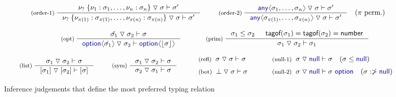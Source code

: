 \documentclass[10pt,preprint,blind,clearpagebib]{sigplanconf}
\newcommand{\langl}{\begin{picture}(4.5,7)
\put(1.1,2.5){\rotatebox{60}{\line(1,0){5.5}}}
\put(1.1,2.5){\rotatebox{300}{\line(1,0){5.5}}}
\end{picture}}
\newcommand{\rangl}{\begin{picture}(4.5,7)
\put(.9,2.5){\rotatebox{120}{\line(1,0){5.5}}}
\put(.9,2.5){\rotatebox{240}{\line(1,0){5.5}}}
\end{picture}}
\newcommand{\kvd}[1]{\textnormal{\textcolor{kvdclr}{\sffamily #1}}}
\newcommand{\ident}[1]{\textnormal{\sffamily #1}}
\newcommand{\tsep}[0]{\; \triangledown \;}
\newcommand{\dropopt}[1]{\lfloor#1\rfloor}
\newcommand{\tytagof}{\ident{tagof}}
\begin{document}
\begin{figure}[t]
\begin{equation*}
\inference[(order-1)\;]
  { \nu_? \; \{ \nu_1 : \sigma_1, \ldots, \nu_n : \sigma_n \} \tsep \sigma \vdash \sigma' }
  { \nu_? \; \{ \nu_{\pi(1)} : \sigma_{\pi(1)}, \ldots, \nu_{\pi(n)} : \sigma_{\pi(n)} \} \tsep \sigma \vdash \sigma' }
\quad
\inference[(order-2)\;]
  { \kvd{any}\langl\sigma_1, \ldots, \sigma_n\rangl \tsep \sigma \vdash \sigma' }
  { \kvd{any}\langl\sigma_{\pi(1)}, \ldots, \sigma_{\pi(n)}\rangl \tsep \sigma \vdash \sigma' }
\quad (\pi~\textnormal{perm.})  
\end{equation*}
\vspace{-2em}

\begin{equation*}
\hspace{3em}
\inference[(opt)\;]
  {\hat{\sigma_1} \tsep \sigma_2 \vdash \sigma}
  {\kvd{option}\langl\hat{\sigma_1}\rangl \tsep \sigma_2 \vdash \kvd{option}\langl\dropopt{\sigma}\rangl}
\qquad
\inference[(prim)\;]
  {\sigma_1 \leq \sigma_2 &
   \tytagof(\sigma_1) = \tytagof(\sigma_2) = \ident{number} }
  {\sigma_1 \tsep \sigma_2 \vdash \sigma_1}\quad
\end{equation*}
\vspace{-2em}

\begin{equation*}
\inference[(list)\;]
  {\sigma_1 \tsep \sigma_2 \vdash \sigma}
  {[\sigma_1] \tsep [\sigma_2] \vdash [\sigma]}
\quad
\inference[(sym)\;]
  {\sigma_1 \tsep \sigma_2 \vdash \sigma}
  {\sigma_2 \tsep \sigma_1 \vdash \sigma}
%
\quad
\begin{array}{l}
 \textnormal{\footnotesize{(refl)}}\;\; \sigma \tsep \sigma \vdash \sigma\\[0.6em]
 \textnormal{\footnotesize{(bot)}}\;\; \bot \tsep \sigma \vdash \sigma
\end{array}
%
\quad
 \begin{array}{l}
 \textnormal{\footnotesize{(null-1)}}\;\; \sigma \tsep \kvd{null} \vdash \sigma \quad(\sigma \leq \kvd{null}) \\[0.6em]
 \textnormal{\footnotesize{(null-2)}}\;\; \sigma \tsep \kvd{null} \vdash \sigma~\kvd{option} \quad(\sigma :\ngtr \kvd{null})
 \end{array}
\end{equation*}

\caption{Inference judgements that define the most preferred typing relation}
\label{fig:subtyping-cst}
\end{figure}
\end{document}
